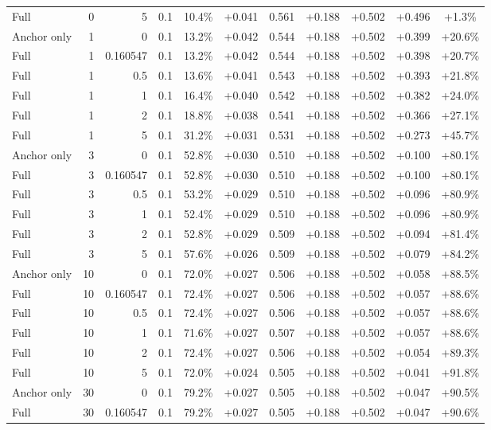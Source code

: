 \begin{table}[htbp]
\begin{tabular}{lrrrccccccc}
Full & 0 & 5 & 0.1 & 10.4\% & +0.041 & 0.561 & +0.188 & +0.502 & +0.496 & +1.3\% \\
Anchor only & 1 & 0 & 0.1 & 13.2\% & +0.042 & 0.544 & +0.188 & +0.502 & +0.399 & +20.6\% \\
Full & 1 & 0.160547 & 0.1 & 13.2\% & +0.042 & 0.544 & +0.188 & +0.502 & +0.398 & +20.7\% \\
Full & 1 & 0.5 & 0.1 & 13.6\% & +0.041 & 0.543 & +0.188 & +0.502 & +0.393 & +21.8\% \\
Full & 1 & 1 & 0.1 & 16.4\% & +0.040 & 0.542 & +0.188 & +0.502 & +0.382 & +24.0\% \\
Full & 1 & 2 & 0.1 & 18.8\% & +0.038 & 0.541 & +0.188 & +0.502 & +0.366 & +27.1\% \\
Full & 1 & 5 & 0.1 & 31.2\% & +0.031 & 0.531 & +0.188 & +0.502 & +0.273 & +45.7\% \\
Anchor only & 3 & 0 & 0.1 & 52.8\% & +0.030 & 0.510 & +0.188 & +0.502 & +0.100 & +80.1\% \\
Full & 3 & 0.160547 & 0.1 & 52.8\% & +0.030 & 0.510 & +0.188 & +0.502 & +0.100 & +80.1\% \\
Full & 3 & 0.5 & 0.1 & 53.2\% & +0.029 & 0.510 & +0.188 & +0.502 & +0.096 & +80.9\% \\
Full & 3 & 1 & 0.1 & 52.4\% & +0.029 & 0.510 & +0.188 & +0.502 & +0.096 & +80.9\% \\
Full & 3 & 2 & 0.1 & 52.8\% & +0.029 & 0.509 & +0.188 & +0.502 & +0.094 & +81.4\% \\
Full & 3 & 5 & 0.1 & 57.6\% & +0.026 & 0.509 & +0.188 & +0.502 & +0.079 & +84.2\% \\
Anchor only & 10 & 0 & 0.1 & 72.0\% & +0.027 & 0.506 & +0.188 & +0.502 & +0.058 & +88.5\% \\
Full & 10 & 0.160547 & 0.1 & 72.4\% & +0.027 & 0.506 & +0.188 & +0.502 & +0.057 & +88.6\% \\
Full & 10 & 0.5 & 0.1 & 72.4\% & +0.027 & 0.506 & +0.188 & +0.502 & +0.057 & +88.6\% \\
Full & 10 & 1 & 0.1 & 71.6\% & +0.027 & 0.507 & +0.188 & +0.502 & +0.057 & +88.6\% \\
Full & 10 & 2 & 0.1 & 72.4\% & +0.027 & 0.506 & +0.188 & +0.502 & +0.054 & +89.3\% \\
Full & 10 & 5 & 0.1 & 72.0\% & +0.024 & 0.505 & +0.188 & +0.502 & +0.041 & +91.8\% \\
Anchor only & 30 & 0 & 0.1 & 79.2\% & +0.027 & 0.505 & +0.188 & +0.502 & +0.047 & +90.5\% \\
Full & 30 & 0.160547 & 0.1 & 79.2\% & +0.027 & 0.505 & +0.188 & +0.502 & +0.047 & +90.6\% \\

\end{tabular}
\end{table}
